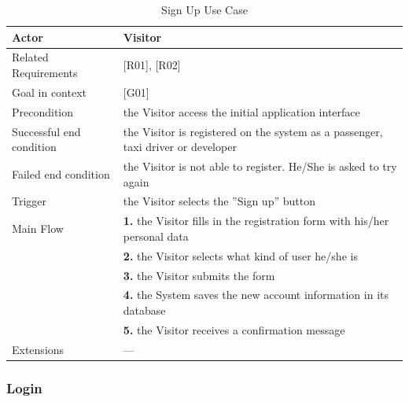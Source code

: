 \begin{table}[htbp]
\begin{center}
\begin{tabular}[t]{p{}p{}}

\hline
Actor & Visitor \\
\hline
Related Requirements & [R01], [R02] \\
\hline
Goal in context & [G01] \\
\hline
Precondition & the Visitor access the initial application interface \\
\hline
Successful end condition & the Visitor is registered on the system as a passenger, taxi driver or developer \\
\hline
Failed end condition & the Visitor is not able to register. He/She is asked to try again \\
\hline
Trigger & the Visitor selects the ''Sign up'' button \\
\hline
Main Flow & \textbf{1.} the Visitor fills in the registration form with his/her personal data \\
& \textbf{2.} the Visitor selects what kind of user he/she is \\
& \textbf{3.} the Visitor submits the form \\
& \textbf{4.} the System saves the new account information in its database \\
& \textbf{5.} the Visitor receives a confirmation message\\
\hline
Extensions & --- \\
\hline

\end{tabular}
\end{center}
\caption{Sign Up Use Case}
\end{table}
\clearpage

\subsubsection{Login}

